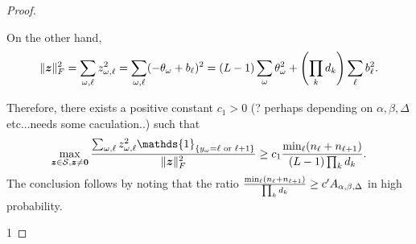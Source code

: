 \documentclass[11pt]{article}
\theoremstyle{plain}
\theoremstyle{definition}
\begin{document}
\begin{proof}
\begin{enumerate}
{On the other hand,
\[
\lVert\bm{z}\rVert_F^2=\sum_{\omega,\ell}z^2_{\omega,\ell}=\sum_{\omega,\ell}(-\theta_\omega+b_\ell)^2=(L-1)\sum_{\omega}\theta^2_\omega+\left(\prod_k d_k\right)\sum_\ell b^2_\ell.
\]

Therefore, there exists a positive constant $c_1>0$ (? perhaps depending on $\alpha, \beta,\Delta$ etc...needs some caculation..) such that
\[
\max_{\mz\in\tS,\mz\neq \mathbf{0}}{\sum_{\omega,\ell} z^2_{\omega,\ell}\mathds{1}_{\{y_\omega=\ell \text{ or }\ell+1\}} \over \FnormSize{}{\mz}^2}\geq c_1 {\min_{\ell}(n_\ell+n_{\ell+1})\over (L-1)\prod_k d_k}.
\]
The conclusion follows by noting that the ratio ${\min_{\ell}(n_\ell+n_{\ell+1})\over \prod_k d_k} \geq c'A_{\alpha,\beta,\Delta}$ in high probability. 
}

\end{enumerate}1
\end{proof}


\end{document}
